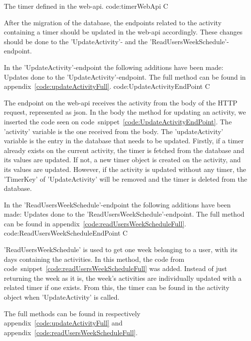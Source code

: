         {The timer defined in the web-api.} %
        {code:timerWebApi} %
        {C} %

After the migration of the database, the endpoints related to the activity containing a timer should be updated  in the web-api accordingly. These changes should be done to the 'UpdateActivity'- and the 'ReadUsersWeekSchedule'-endpoint.

In the 'UpdateActivity'-endpoint the following additions have been made:
        {Updates done to the 'UpdateActivity'-endpoint. The full method can be found in appendix~\ref{code:updateActivityFull}.} %
        {code:UpdateActivityEndPoint} %
        {C} %
        
The endpoint on the web-api receives the activity from the body of the HTTP request, represented as json. In the body the method for updating an activity, we inserted the code seen on code~snippet~\ref{code:UpdateActivityEndPoint}. The 'activity' variable is the one received from the body. The 'updateActivity' variable is the entry in the database that needs to be updated. Firstly, if a timer already exists on the current activity, the timer is fetched from the database and its values are updated. If not, a new timer object is created on the activity, and its values are updated.
However, if the activity is updated without any timer, the 'TimerKey' of 'UpdateActivity' will be removed and the timer is deleted from the database.

In the 'ReadUsersWeekSchedule'-endpoint the following additions have been made:
        {Updates done to the 'ReadUsersWeekSchedule'-endpoint. The full method can be found in appendix~\ref{code:readUsersWeekScheduleFull}.} %
        {code:ReadUsersWeekScheduleEndPoint} %
        {C} %

'ReadUsersWeekSchedule' is used to get one week belonging to a user, with its days containing the activities. In this method, the code from code~snippet~\ref{code:readUsersWeekScheduleFull} was added.
Instead of just returning the week as it is, the week's activities are individually updated with a related timer if one exists. From this, the timer can be found in the activity object when 'UpdateActivity' is called.

The full methods can be found in respectively appendix~\ref{code:updateActivityFull} and appendix~\ref{code:readUsersWeekScheduleFull}.

